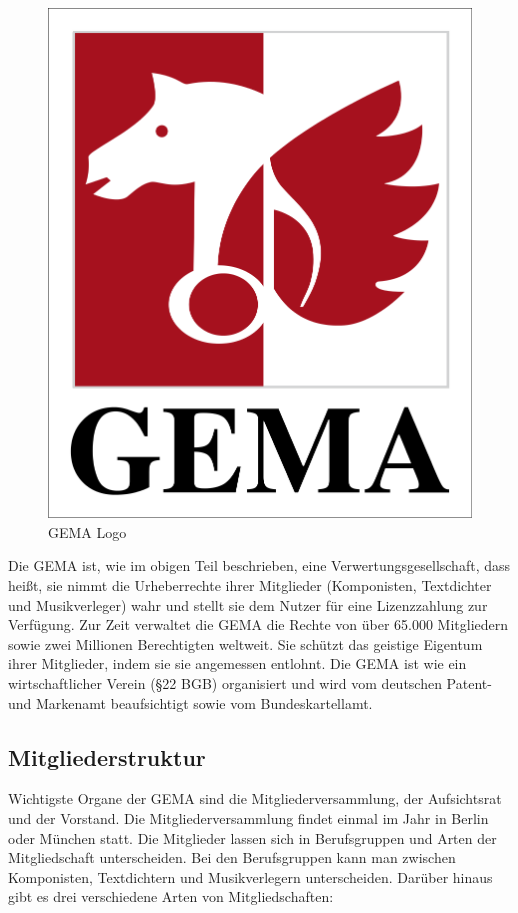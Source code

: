 \begin{figure}[H] 
\centering 
\includegraphics[scale=0.15]{se-wa-jpg/gema} 
\caption[GEMA Logo]{GEMA Logo} 
\label{gema_logo} 
\end{figure}

Die GEMA ist, wie im obigen Teil beschrieben, eine Verwertungsgesellschaft, dass heißt, sie nimmt die Urheberrechte ihrer Mitglieder (Komponisten, Textdichter und Musikverleger) wahr und stellt sie dem Nutzer für eine Lizenzzahlung zur Verfügung. Zur Zeit verwaltet die GEMA die Rechte von über 65.000 Mitgliedern sowie zwei Millionen Berechtigten weltweit. Sie schützt das geistige Eigentum ihrer Mitglieder, indem sie sie angemessen entlohnt. Die GEMA ist wie ein wirtschaftlicher Verein (§22 BGB) organisiert und wird vom deutschen Patent- und Markenamt beaufsichtigt sowie vom Bundeskartellamt.
\newline
\subsection{Mitgliederstruktur}
\label{mitlgiederstruktur}
Wichtigste Organe der GEMA sind die Mitgliederversammlung, der Aufsichtsrat und der Vorstand. Die Mitgliederversammlung findet einmal im Jahr in Berlin oder München statt. Die Mitglieder lassen sich in Berufsgruppen und Arten der Mitgliedschaft unterscheiden. Bei den Berufsgruppen kann man zwischen Komponisten, Textdichtern und Musikverlegern unterscheiden. Darüber hinaus gibt es drei verschiedene Arten von Mitgliedschaften:
\newpage

